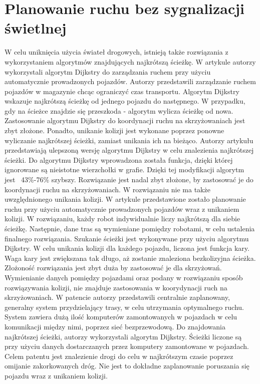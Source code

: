 \section{Planowanie ruchu bez sygnalizacji świetlnej}

W celu uniknięcia użycia świateł drogowych, istnieją także rozwiązania z wykorzystaniem algorytmów znajdujących najkrótszą ścieżkę. W artykule \cite{shaikh2013agv} autorzy wykorzystali algorytm Dijkstry do zarządzania ruchem przy użyciu automatycznie prowadzonych pojazdów. Autorzy przedstawili zarządzanie ruchem pojazdów w magazynie chcąc ograniczyć czas transportu. Algorytm Dijkstry wskazuje najkrótszą ścieżkę od jednego pojazdu do następnego. W przypadku, gdy na ścieżce znajdzie się przeszkoda - algorytm wylicza ścieżkę od nowa. Zastosowanie algorytmu Dijkstry do koordynacji ruchu na skrzyżowaniach jest zbyt złożone. Ponadto, unikanie kolizji jest wykonane poprzez ponowne wyliczanie najkrótszej ścieżki, zamiast unikania ich na bieżąco.
\newline
\indent
Autorzy artykułu \cite{huang2013improved} przedstawiają ulepszoną wersję algorytmu Dijkstry w celu znalezienia najkrótszej ścieżki. Do algorytmu Dijkstry wprowadzona została funkcja, dzięki której ignorowane są nieistotne wierzchołki w grafie. Dzięki tej modyfikacji algorytm jest ~43\%-76\% szybszy. Rozwiązanie jest nadal zbyt złożone, by zastosować je do koordynacji ruchu na skrzyżowaniach. W rozwiązaniu nie ma także uwzględnionego unikania kolizji.
\newline
\indent
W artykule \cite{ando2003autonomous} przedstawione zostało planowanie ruchu przy użyciu automatycznie prowadzonych pojazdów wraz z unikaniem kolizji. W rozwiązaniu, każdy robot indywidualnie liczy najkrótszą dla siebie ścieżkę. Następnie, dane tras są wymieniane pomiędzy robotami, w celu ustalenia finalnego rozwiązania. Szukanie ścieżki jest wykonywane przy użyciu algorytmu Dijkstry. W celu unikania kolizji dla każdego pojazdu, liczona jest funkcja kary. Waga kary jest zwiększana tak długo, aż zostanie znaleziona bezkolizyjna ścieżka. Złożoność rozwiązania jest zbyt duża by zastosować je dla skrzyżowań. Wymienianie danych pomiędzy pojazdami oraz podany w rozwiązaniu sposób rozwiązywania kolizji, nie znajduje zastosowania w koorydynacji ruch na skrzyżowaniach.
\newline
\indent
W patencie \cite{gazis1997optimal} autorzy przedstawili centralnie zaplanowany, generalny system przydzielający trasy, w celu utrzymania optymalnego ruchu. System zawiera dużą ilość komputerów zamontowanych w pojazdach w celu komunikacji między nimi, poprzez sieć bezprzewodową. Do znajdowania najkrótszej ścieżki, autorzy wykorzystali algorytm Dijkstry. Ścieżki liczone są przy użyciu danych dostarczanych przez komputery zamontowane w pojazdach. Celem patentu jest znalezienie drogi do celu w najkrótszym czasie poprzez omijanie zakorkowanych dróg. Nie jest to dokładne zaplanowanie poruszania się pojazdu wraz z unikaniem kolizji.
